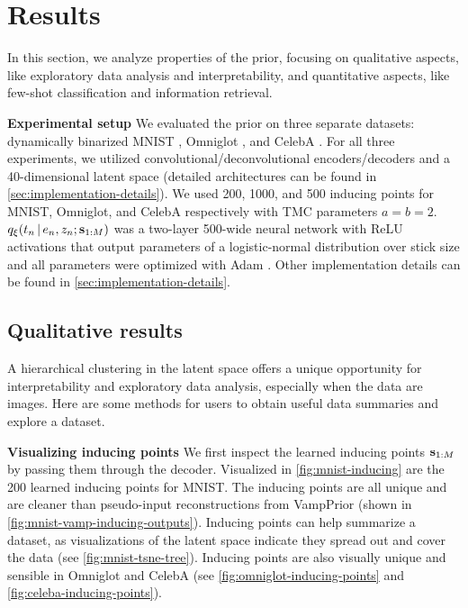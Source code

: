 \section{Results}
In this section, we 
analyze properties of the
\acronym\;prior,
focusing on
qualitative aspects, like exploratory data analysis and interpretability,
and quantitative aspects, like few-shot classification and information retrieval.

\textbf{Experimental setup} We evaluated
the \acronym\;prior on three separate
datasets: dynamically binarized MNIST \citep{Lecun1998}, Omniglot \citep{Lake2015},
and CelebA \citep{Liu2015}. 
For all three experiments,
we utilized convolutional/deconvolutional encoders/decoders
and a 40-dimensional
latent space (detailed architectures can be found
in \autoref{sec:implementation-details}).
We used 200, 1000, and 500 inducing points for MNIST, Omniglot, and CelebA respectively 
with TMC parameters $a = b = 2$.
$q_{\xi}(t_n \,|\, e_n, z_n; \mathbf{s}_{1:M})$ was a
two-layer 500-wide neural network
with ReLU activations that output parameters of a
logistic-normal distribution over stick size
and all parameters were optimized with Adam \citep{Kingma2014adam}.
Other implementation details can be found in \autoref{sec:implementation-details}.

\subsection{Qualitative results}

A hierarchical clustering in the latent space
offers a unique opportunity for interpretability
and exploratory data analysis,
especially when the data are images.
Here are some methods for users to obtain
useful data summaries and explore a dataset.

\textbf{Visualizing inducing points}
We first inspect the learned inducing points $\mathbf{s}_{1:M}$
by passing them through the decoder.
Visualized in \autoref{fig:mnist-inducing}
are the 200 learned inducing points for MNIST.
The inducing points are all unique
and are cleaner than pseudo-input reconstructions from VampPrior (shown in
\autoref{fig:mnist-vamp-inducing-outputs}).
Inducing points can help summarize a
dataset, as visualizations of the latent space
indicate they spread out and cover the data
(see \autoref{fig:mnist-tsne-tree}). Inducing points
are also visually unique and sensible
in Omniglot and CelebA (see
\autoref{fig:omniglot-inducing-points} and \ref{fig:celeba-inducing-points}).

